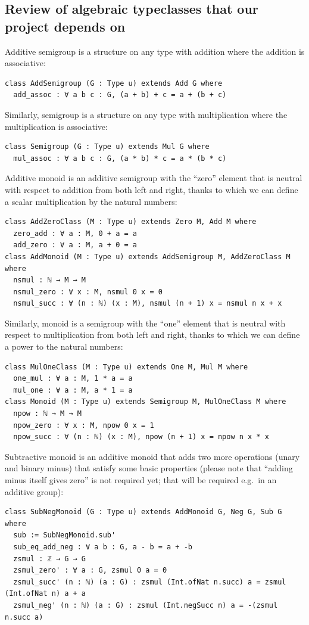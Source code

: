 \documentclass[]{article}
\renewcommand{\.}{\hskip .75pt}
\begin{document}
\subsection{Review of algebraic typeclasses that our project depends on}

Additive semigroup is a structure on any type with addition where the addition is associative:
\begin{lstlisting}
class AddSemigroup (G : Type u) extends Add G where
  add_assoc : ∀ a b c : G, (a + b) + c = a + (b + c)
\end{lstlisting}
Similarly, semigroup is a structure on any type with multiplication where the multiplication is associative:
\begin{lstlisting}
class Semigroup (G : Type u) extends Mul G where
  mul_assoc : ∀ a b c : G, (a * b) * c = a * (b * c)
\end{lstlisting}
Additive monoid is an additive semigroup with the ``zero'' element that is neutral with respect to addition
from both left and right, thanks to which we can define a scalar multiplication by the natural numbers:
\begin{lstlisting}
class AddZeroClass (M : Type u) extends Zero M, Add M where
  zero_add : ∀ a : M, 0 + a = a
  add_zero : ∀ a : M, a + 0 = a
class AddMonoid (M : Type u) extends AddSemigroup M, AddZeroClass M where
  nsmul : ℕ → M → M
  nsmul_zero : ∀ x : M, nsmul 0 x = 0 
  nsmul_succ : ∀ (n : ℕ) (x : M), nsmul (n + 1) x = nsmul n x + x 
\end{lstlisting}
Similarly, monoid is a semigroup with the ``one'' element that is neutral with respect to multiplication
from both left and right, thanks to which we can define a power to the natural numbers:
\begin{lstlisting}
class MulOneClass (M : Type u) extends One M, Mul M where
  one_mul : ∀ a : M, 1 * a = a
  mul_one : ∀ a : M, a * 1 = a
class Monoid (M : Type u) extends Semigroup M, MulOneClass M where
  npow : ℕ → M → M 
  npow_zero : ∀ x : M, npow 0 x = 1 
  npow_succ : ∀ (n : ℕ) (x : M), npow (n + 1) x = npow n x * x 
\end{lstlisting}
Subtractive monoid is an additive monoid that adds two more operations (unary and binary minus)
that satisfy some basic properties (please note that ``adding minus itself gives zero''
is not required yet; that will be required e.g.~in an additive group):
\begin{lstlisting}
class SubNegMonoid (G : Type u) extends AddMonoid G, Neg G, Sub G where
  sub := SubNegMonoid.sub'
  sub_eq_add_neg : ∀ a b : G, a - b = a + -b 
  zsmul : ℤ → G → G
  zsmul_zero' : ∀ a : G, zsmul 0 a = 0 
  zsmul_succ' (n : ℕ) (a : G) : zsmul (Int.ofNat n.succ) a = zsmul (Int.ofNat n) a + a
  zsmul_neg' (n : ℕ) (a : G) : zsmul (Int.negSucc n) a = -(zsmul n.succ a)
\end{lstlisting}
\end{document}
